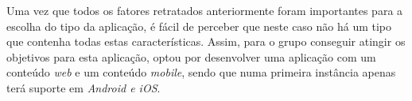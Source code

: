 Uma vez que todos os fatores retratados anteriormente foram importantes para a escolha do tipo da aplicação, é fácil de perceber que neste caso não há um tipo que contenha todas estas características. Assim, para o grupo conseguir atingir os objetivos para esta aplicação, optou por desenvolver uma aplicação com um conteúdo \textit{web} e um conteúdo \textit{mobile}, sendo que numa primeira instância apenas terá suporte em \textit{Android e iOS}.